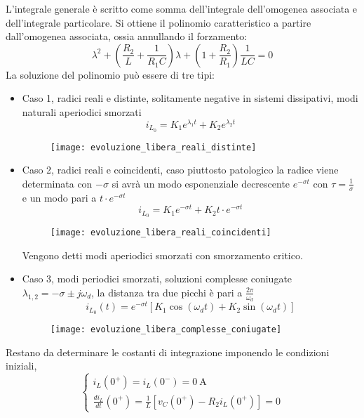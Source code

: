 L'integrale generale è scritto come somma dell'integrale dell'omogenea associata e dell'integrale particolare.
Si ottiene il polinomio caratteristico a partire dall'omogenea associata, ossia annullando il forzamento:
\begin{equation}
\lambda^2 + \left(\frac{R_2}{L} + \frac{1}{R_1 C}\right)\lambda + \left(1+\frac{R_2}{R_1}\right)\frac{1}{LC} = 0
\end{equation}
La soluzione del polinomio può essere di tre tipi:

\begin{itemize}
\item Caso 1, radici reali e distinte, solitamente negative in sistemi dissipativi, modi naturali aperiodici 
smorzati
$$
i_{L_0} = K_1 e^{\lambda_1 t} + K_2 e^{\lambda_2 t}
$$
\begin{figure}[H]
\centering
\texttt{[image: evoluzione\_libera\_reali\_distinte]}
\end{figure}


\item Caso 2, radici reali e coincidenti, caso piuttosto patologico
la radice viene determinata con $-\sigma$ si avrà un modo esponenziale decrescente $e^{-\sigma t} $ con
$\tau = \frac{1}{\sigma}$ e un modo pari a  $t\cdot e^{-\sigma t}$
$$
i_{L_0} = K_1 e^{-\sigma t} + K_2 t\cdot e^{-\sigma t}
$$
\begin{figure}[H]
\centering
\texttt{[image: evoluzione\_libera\_reali\_coincidenti]}
\end{figure}
Vengono detti modi aperiodici smorzati con smorzamento critico.


\item Caso 3, modi periodici smorzati, soluzioni complesse coniugate
$\lambda_{1,2} = -\sigma \pm j\omega_d$, la distanza tra due picchi è pari a $\frac{2\pi}{\omega_d}$
$$i_{L_0}(t) = e^{-\sigma t} [K_1 \cos (\omega_d t) + K_2 \sin(\omega_d t)]$$
\begin{figure}[H]
\centering
\texttt{[image: evoluzione\_libera\_complesse\_coniugate]}
\end{figure}
\end{itemize}

Restano da determinare le costanti di integrazione imponendo le condizioni iniziali,
\begin{equation*}
\begin{cases}
i_L(0^+) = i_L(0^-) = \SI{0}{\ampere}\\
\frac{di_L}{dt}(0^+) = \frac{1}{L}[v_C(0^+) - R_2i_L(0^+)] = 0
\end{cases}
\end{equation*}

